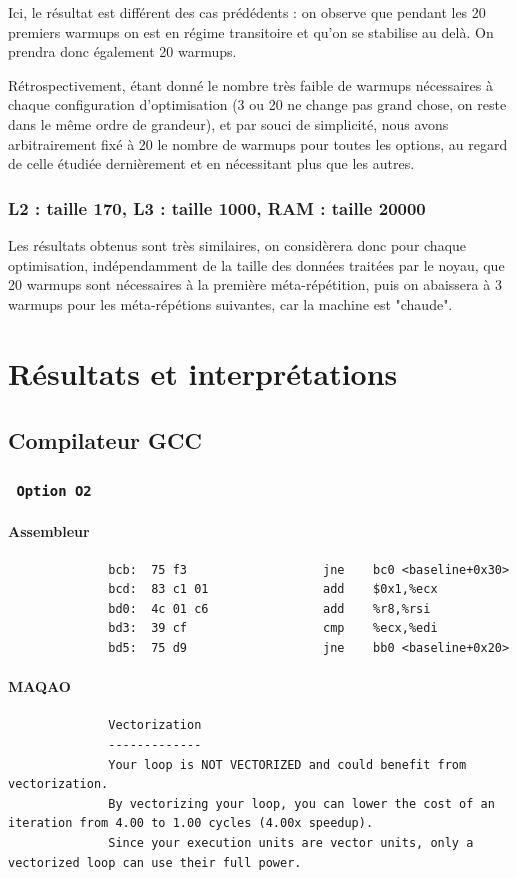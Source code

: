 \documentclass{report}
\begin{document}
	Ici, le résultat est différent des cas prédédents : on observe que pendant les 20 premiers warmups on est en régime transitoire et qu'on se stabilise au delà. On prendra donc également 20 warmups.

	Rétrospectivement, étant donné le nombre très faible de warmups nécessaires à chaque configuration d'optimisation (3 ou 20 ne change pas grand chose, on reste dans le même ordre de grandeur), et par souci de simplicité, nous avons arbitrairement fixé à 20 le nombre de warmups pour toutes les options, au regard de celle étudiée dernièrement et en nécessitant plus que les autres.

    \subsubsection{L2 : taille 170, L3 : taille 1000, RAM : taille 20000}
    Les résultats obtenus sont très similaires, on considèrera donc pour chaque optimisation, indépendamment de la taille des données traitées par le noyau, que 20 warmups sont nécessaires à la première méta-répétition, puis on abaissera à 3 warmups pour les méta-répétions suivantes, car la machine est "chaude".
\newpage
\section{Résultats et interprétations}
    \subsection{Compilateur GCC\textsuperscript \textcopyleft  }
      \subsubsection{ \texttt{ Option O2 } }
          \paragraph{Assembleur}
            \begin{verbatim}
              bcb:	75 f3                	jne    bc0 <baseline+0x30>
              bcd:	83 c1 01             	add    $0x1,%ecx
              bd0:	4c 01 c6             	add    %r8,%rsi
              bd3:	39 cf                	cmp    %ecx,%edi
              bd5:	75 d9                	jne    bb0 <baseline+0x20>
            \end{verbatim}
          \paragraph{MAQAO}
            \begin{verbatim}
              Vectorization
              -------------
              Your loop is NOT VECTORIZED and could benefit from vectorization.
              By vectorizing your loop, you can lower the cost of an iteration from 4.00 to 1.00 cycles (4.00x speedup).
              Since your execution units are vector units, only a vectorized loop can use their full power.
            \end{verbatim}
\end{document}
